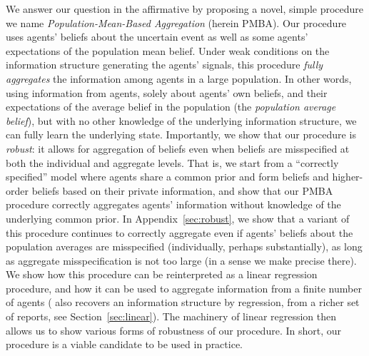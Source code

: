 \documentclass[12pt,reqno]{amsart}
\begin{document}
We answer our question in the affirmative by proposing a novel, simple procedure we name \emph{Population-Mean-Based Aggregation} (herein PMBA). Our procedure uses agents' beliefs about the uncertain event as well as some agents' expectations of the population mean belief. Under weak conditions on the information structure generating the agents' signals, this procedure \emph{fully aggregates} the information among agents in a large population. In other words, using information from agents, solely about agents' own beliefs, and their expectations of the average belief in the population (the \emph{population average belief}), but with no other knowledge of the underlying information structure, we can fully learn the underlying state. Importantly, we show that our procedure is \emph{robust}: it allows for aggregation of beliefs even when beliefs are misspecified at both the individual and aggregate levels. That is, we start from a ``correctly specified'' model where agents share a common prior and form beliefs and higher-order beliefs based on their private information, and show that our PMBA procedure correctly aggregates agents' information without knowledge of the underlying common prior.  In Appendix~\ref{sec:robust}, we show that a variant of this procedure continues to correctly aggregate even if agents' beliefs about the population averages are misspecified (individually, perhaps substantially), as long as aggregate misspecification is not too large (in a sense we make precise there). We show how this procedure can be reinterpreted as a linear regression procedure, and how it can be used to aggregate information from a finite number of agents (\cite{libgober2025wisdom} also recovers an information structure by regression, from a richer set of reports, see Section~\ref{sec:linear}). The machinery of linear regression then allows us to show various forms of robustness of our procedure. In short, our procedure is a viable candidate to be used in practice.  
\end{document}
